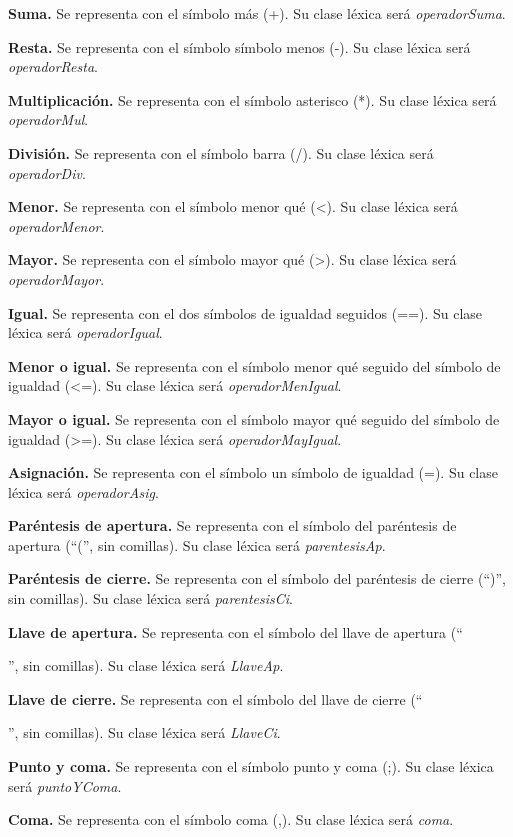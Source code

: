 \begin{itemize}
    \item \textbf{Suma.} Se representa con el símbolo más (+). Su clase léxica será \textit{operadorSuma}.
    \item \textbf{Resta.} Se representa con el símbolo símbolo menos (-). Su clase léxica será \textit{operadorResta}.
    \item \textbf{Multiplicación.} Se representa con el símbolo asterisco (*). Su clase léxica será \textit{operadorMul}.
    \item \textbf{División.} Se representa con el símbolo barra (/). Su clase léxica será \textit{operadorDiv}.
    \item \textbf{Menor.} Se representa con el símbolo menor qué (<). Su clase léxica será \textit{operadorMenor}.
    \item \textbf{Mayor.} Se representa con el símbolo mayor qué (>). Su clase léxica será \textit{operadorMayor}.
    \item \textbf{Igual.} Se representa con el dos símbolos de igualdad seguidos (==). Su clase léxica será \textit{operadorIgual}.
    \item \textbf{Menor o igual.} Se representa con el símbolo menor qué seguido del símbolo de igualdad (<=). Su clase léxica será \textit{operadorMenIgual}.
    \item \textbf{Mayor o igual.} Se representa con el símbolo mayor qué seguido del símbolo de igualdad (>=). Su clase léxica será \textit{operadorMayIgual}.
    \item \textbf{Asignación.} Se representa con el símbolo un símbolo de igualdad (=). Su clase léxica será \textit{operadorAsig}.
    \item \textbf{Paréntesis de apertura.} Se representa con el símbolo del paréntesis de apertura (``('', sin comillas). Su clase léxica será \textit{parentesisAp}.
    \item \textbf{Paréntesis de cierre.} Se representa con el símbolo del paréntesis de cierre (``)'', sin comillas). Su clase léxica será \textit{parentesisCi}.
    \item \textbf{Llave de apertura.} Se representa con el símbolo del llave de apertura (``{'', sin comillas). Su clase léxica será \textit{LlaveAp}.
    \item \textbf{Llave de cierre.} Se representa con el símbolo del llave de cierre (``}'', sin comillas). Su clase léxica será \textit{LlaveCi}.
    \item \textbf{Punto y coma.} Se representa con el símbolo punto y coma (;). Su clase léxica será \textit{puntoYComa}.
    \item \textbf{Coma.} Se representa con el símbolo coma (,). Su clase léxica será \textit{coma}.
\end{itemize}
